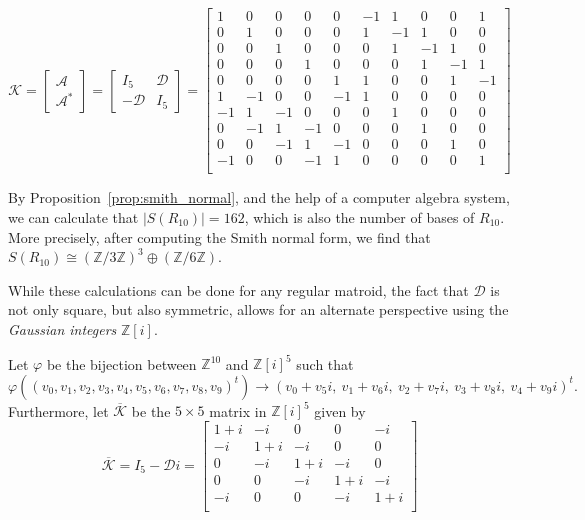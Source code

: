 \documentclass[12p]{amsart}
\numberwithin{equation}{section}
\theoremstyle{plain}
\theoremstyle{definition}
\newcommand{\Z}{\mathbb {Z}}
\begin{document}
\[\mathcal K = \begin{bmatrix} \mathcal A\\ \mathcal A^* \end{bmatrix} = \begin{bmatrix} I_5 & \mathcal D \\ -\mathcal D & I_5 \end{bmatrix}= \begin{bmatrix}
    1 & 0 & 0 & 0 & 0 &   -1 & 1 & 0 & 0 & 1\\
    0 & 1 & 0 & 0 & 0 &   1 & -1 & 1 & 0 & 0\\
    0 & 0 & 1 & 0 & 0 &   0 & 1 & -1 & 1 & 0\\
    0 & 0 & 0 & 1 & 0 &   0 & 0 & 1 & -1 & 1\\
    0 & 0 & 0 & 0 & 1 &   1 & 0 & 0 & 1 & -1\\
    1 & -1 & 0 & 0 & -1 &  1 & 0 & 0 & 0 & 0\\
    -1 & 1 & -1 & 0 & 0 &  0 & 1 & 0 & 0 & 0\\
    0 & -1 & 1 & -1 & 0 &  0 & 0 & 1 & 0 & 0\\
    0 & 0 & -1 & 1 & -1 &  0 & 0 & 0 & 1 & 0\\
    -1 & 0 & 0 & -1 & 1 &  0 & 0 & 0 & 0 & 1\\
\end{bmatrix}\]

By Proposition~\ref{prop:smith_normal}, and the help of a computer algebra system, we can calculate that $|S(R_{10})| = 162$, which is also the number of bases of $R_{10}$. More precisely, after computing the Smith normal form, we find that $S(R_{10}) \cong (\Z/3\Z)^3 \oplus (\Z/6\Z)$.

While these calculations can be done for any regular matroid, the fact that $\mathcal D$ is not only square, but also symmetric, allows for an alternate perspective using the \emph{Gaussian integers} $\Z[i]$.

Let $\varphi$ be the bijection between $\Z^{10}$ and $\Z[i]^5$ such that 
\[\varphi((v_0,v_1,v_2,v_3,v_4,v_5,v_6,v_7,v_8,v_9)^t) \to (v_0 + v_5i,~v_1 + v_6i,~v_2 + v_7i,~v_3 + v_8i,~v_4 + v_9i)^t.\]
Furthermore, let $\overline{\mathcal K}$ be the $5\times 5$ matrix in $\Z[i]^5$ given by 
\[\overline{\mathcal K} =  I_5 - \mathcal D i =\begin{bmatrix}
    1 + i & -i & 0 & 0 & -i \\
    -i & 1 + i & -i & 0 & 0 \\
    0 & -i & 1 + i & -i & 0 \\
    0 & 0 & -i & 1 + i & -i \\
    -i & 0 & 0 & -i & 1 + i \\
\end{bmatrix}\]
\end{document}
